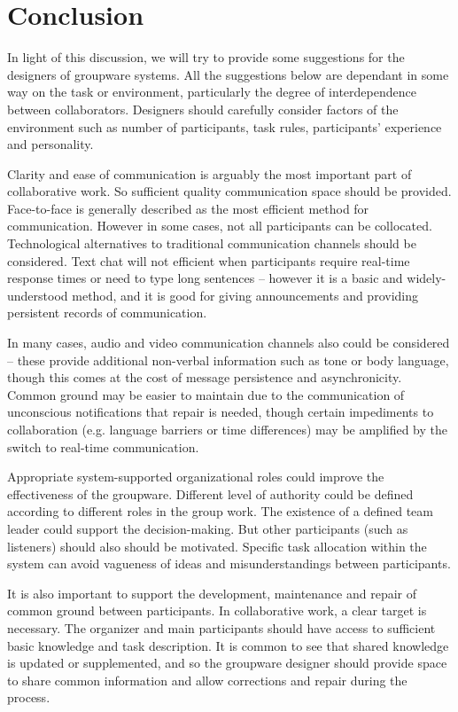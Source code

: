 \documentclass{acm_proc_article-sp}
\begin{document}
\section{Conclusion}

In light of this discussion, we will try to provide some suggestions for the designers of groupware systems. All the suggestions below are dependant in some way on the task or environment, particularly the degree of interdependence between collaborators. Designers should carefully consider factors of the environment such as number of participants, task rules, participants' experience and personality.
 
Clarity and ease of communication is arguably the most important part of collaborative work. So sufficient quality communication space should be provided. Face-to-face is generally described as the most efficient method for communication. However in some cases, not all participants can be collocated. Technological alternatives to traditional communication channels should be considered. Text chat will not efficient when participants require real-time response times or need to type long sentences -- however it is a basic and widely-understood method, and it is good for giving announcements and providing persistent records of communication. 

In many cases, audio and video communication channels also could be considered -- these provide additional non-verbal information such as tone or body language, though this comes at the cost of message persistence and asynchronicity. Common ground may be easier to maintain due to the communication of unconscious notifications that repair is needed, though certain impediments to collaboration (e.g. language barriers or time differences) may be amplified by the switch to real-time communication.

Appropriate system-supported organizational roles could improve the effectiveness of the groupware. Different level of authority could be defined according to different roles in the group work. The existence of a defined team leader could support the decision-making. But other participants (such as listeners) should also should be motivated. Specific task allocation within the system can avoid vagueness of ideas and misunderstandings between participants. 

It is also important to support the development, maintenance and repair of common ground between participants. In collaborative work, a clear target is necessary. The organizer and main participants should have access to sufficient basic knowledge and task description. It is common to see that shared knowledge is updated or supplemented, and so the groupware designer should provide space to share common information and allow corrections and repair during the process.



%


\balancecolumns
\end{document}
